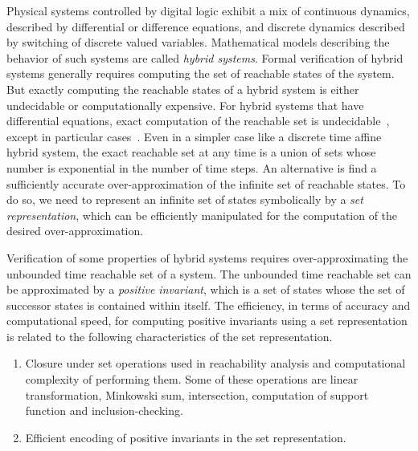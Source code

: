 
Physical systems controlled by digital logic exhibit a mix of
continuous dynamics, described by differential or difference
equations, and discrete dynamics described by switching of discrete
valued variables.  Mathematical models describing the behavior of such
systems are called \emph{hybrid systems}.  Formal verification of
hybrid systems generally requires computing the set of reachable
states of the system.  But exactly computing the reachable states of a
hybrid system is either undecidable or computationally expensive.  For
hybrid systems that have differential equations, exact computation of
the reachable set is undecidable~\cite{alur1995algorithmic}, except in
particular cases~\cite{lafferriere1998decidable}.  Even in a simpler
case like a discrete time affine hybrid system, the exact reachable
set at any time is a union of sets whose number is exponential in the
number of time steps.  An alternative is find a sufficiently accurate
over-approximation of the infinite set of reachable states.  To do so,
we need to represent an infinite set of states symbolically by a {\it
set representation}, which can be efficiently manipulated for the
computation of the desired over-approximation.


Verification of some properties of hybrid systems requires
over-approximating the unbounded time reachable set of a system.  The
unbounded time reachable set can be approximated by a \emph{positive
invariant}, which is a set of states whose the set of successor states is
contained within itself.  The efficiency, in terms of accuracy and
computational speed, for computing positive invariants using a set
representation is related to the following characteristics of the set
representation.
%
\begin{enumerate}
\item Closure under set operations used in reachability analysis and computational complexity of
performing them.  Some of these operations are linear transformation,
Minkowski sum, intersection, computation of support function and
inclusion-checking.
\item Efficient encoding of positive invariants in the set representation.
\end{enumerate}

